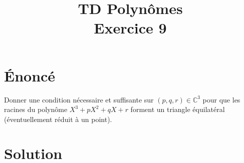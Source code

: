\documentclass[french]{article}
\title{TD Polynômes \\ Exercice 9}
\date{}
\newcommand{\C}{\mathbb{C}}
\begin{document}
\maketitle

\section{Énoncé}
Donner une condition nécessaire et suffisante sur $(p,q,r)\in\C^3$ pour que les racines du polynôme $X^3+pX^2+qX+r$ forment un triangle équilatéral (éventuellement réduit à un point).
\section{Solution}
\end{document}
